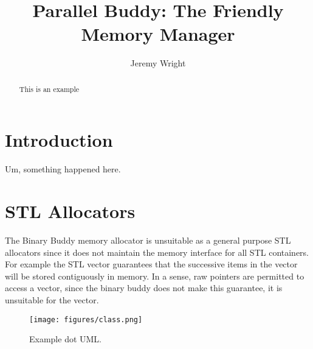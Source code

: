\documentclass[10pt]{article}
\title{Parallel Buddy: The Friendly Memory Manager}
\author{Jeremy Wright}
\begin{document}
\maketitle

\begin{abstract}
This is an example
\end{abstract}

\section{Introduction}
Um, something happened here.


\section{STL Allocators}
The Binary Buddy memory allocator is unsuitable as a general purpose STL
allocators since it does not maintain the memory interface for all STL
containers. For example the STL vector guarantees that the successive items in
the vector will be stored contiguously in memory. In a sense, raw pointers are
permitted to access a vector, since the binary buddy does not make this
guarantee, it is unsuitable for the vector.


\begin{figure*}[h]
\texttt{[image: figures/class.png]}
\caption{Example dot UML.}
\label{fig:example_uml}
\end{figure*}
\end{document}
